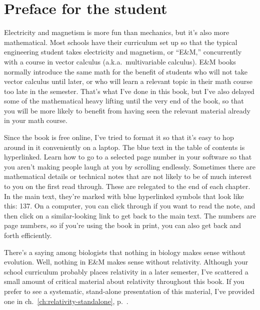 \section*{Preface for the student}%

Electricity and magnetism is more fun than mechanics, but it's
also more mathematical. Most schools have their curriculum set up
so that the typical engineering student takes electricity and magnetism,
or ``E\&M,'' concurrently with a course in vector calculus (a.k.a.~multivariable
calculus). E\&M books normally introduce the same math for the benefit of
students who will not take vector calculus until later, or who will learn
a relevant topic in their math course too late in the semester. That's
what I've done in this book, but I've also delayed some of the mathematical
heavy lifting until the very end of the book, so that you will be more likely to
benefit from having seen the relevant material already in your math
course.

Since the book is free online, I've tried to format it so that it's
easy to hop around in it conveniently on a laptop. The blue text in the
table of contents is hyperlinked. Learn how to go to a selected page number
in your software so that you aren't making people laugh at you by scrolling
endlessly. Sometimes there are mathematical details or technical notes that
are not likely to be of much interest to you on the first read through.
These are relegated to the end of each chapter. In the main text, they're
marked with blue hyperlinked symbols that look like this: 
\dangerousbend{}137. On a computer, you can click through if you want to
read the note, and then click on a similar-looking link to get back to
the main text. The numbers are page numbers, so if you're using the book in print,
you can also get back and forth efficiently.

There's a saying among biologists that nothing in biology makes sense without
evolution. Well, nothing in E\&M makes sense without relativity. Although
your school curriculum probably places relativity in a later semester, I've
scattered a small amount of critical material about relativity throughout
this book. If you prefer to see a systematic, stand-alone presentation of
this material, I've provided one in ch.~\ref{ch:relativity-standalone}, p.~\pageref{ch:relativity-standalone}.
